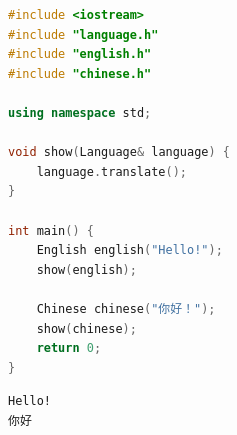 \begin{lstlisting}[language=C++, title=test\_language.cpp]
#include <iostream>
#include "language.h"
#include "english.h"
#include "chinese.h"

using namespace std;

void show(Language& language) {
	language.translate();
}

int main() {
	English english("Hello!");
	show(english);

	Chinese chinese("你好！");
	show(chinese);
	return 0;
}
\end{lstlisting}

\begin{tcolorbox}
	\begin{verbatim}
Hello!
你好
	\end{verbatim}
\end{tcolorbox}

\newpage